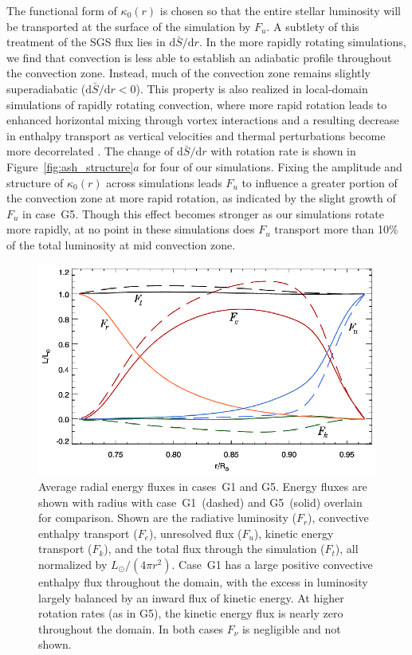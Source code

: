 The functional form of $\kappa_0(r)$ is chosen so that the entire stellar
luminosity will be transported at the surface of the simulation by $F_u$.
A subtlety of this treatment of the SGS
flux lies in $\mathrm{d} \bar{S}/\mathrm{d}r$.  In the more rapidly
rotating simulations, we find that convection is less able to establish
an adiabatic profile throughout the convection zone.  Instead, much of
the convection zone remains slightly superadiabatic 
($\mathrm{d} \bar{S}/\mathrm{d}r < 0$).  This property is also realized in
local-domain simulations of rapidly rotating convection, where more
rapid rotation leads to enhanced horizontal mixing through vortex
interactions and a resulting decrease in enthalpy transport as
vertical velocities and thermal perturbations become more decorrelated
\citep{Julien_et_al_1996, Brummell_et_al_1996}.  The change of
$\mathrm{d} \bar{S}/\mathrm{d}r$ with rotation rate is shown in
Figure~\ref{fig:ash_structure}$a$ for four of our simulations.  Fixing
the amplitude and structure of $\kappa_0(r)$ across simulations leads
$F_u$ to influence a greater portion of the convection zone at more
rapid rotation, as indicated by the slight growth of $F_u$ in case~G5.
Though this effect becomes stronger as our simulations rotate more
rapidly, at no point in these simulations does $F_u$ transport more
than 10\% of the total luminosity at mid convection zone.  

\begin{figure}[!ht]
  \begin{center}
    \includegraphics[width=0.7\linewidth]{figs/chapter_3/Figure_13.eps}
  \end{center}
  \caption[Average radial energy fluxes in cases~G1 and G5]
  {Average radial energy fluxes in cases~G1 and G5.  Energy fluxes are
  shown with radius with case~G1~(dashed) and G5~(solid) overlain for comparison.
  Shown are the radiative  luminosity ($F_r$), convective enthalpy transport
  ($F_e$), unresolved flux ($F_u$), kinetic energy transport
  ($F_k$), and the total flux through the
  simulation ($F_t$), all normalized by $L_\odot/(4 \pi r^2)$.  
  Case~G1 has a large positive
  convective enthalpy flux throughout the domain, with
  the excess in luminosity largely balanced by an inward flux of kinetic energy.
  At higher rotation rates (as in G5), the kinetic energy flux is nearly zero
  throughout the domain.  In both cases $F_\nu$ is negligible and not shown.
  \label{fig:flux_balance}}
\end{figure}




